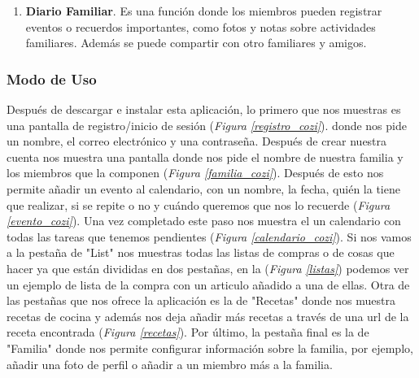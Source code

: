 \begin{enumerate}
    \begin{enumerate}
        \item Organizador de Menús. Facilita organizar las comidas con antelación y evita el estrés diario de decidir qué cocinar. 
        \item Recetas Integradas. Puedes guardar y organizar recetas directamente en la aplicación y con solo un clic. 
        \item Sincronización con el calendario. Los menús planificados pueden sincronizarse con el calendario para que toda la familia lo vea. 
    \end{enumerate}
    \item \textbf{Diario Familiar}. Es una función donde los miembros pueden registrar eventos o recuerdos importantes, como fotos y notas sobre actividades familiares. 
    Además se puede compartir con otro familiares y amigos.
\end{enumerate}

\subsubsection{Modo de Uso}
\label{subsec:uso_cozi}
Después de descargar e instalar esta aplicación, lo primero que nos muestras es una pantalla de registro/inicio de sesión (\textit{Figura \ref{registro_cozi}}).
donde nos pide un nombre, el correo electrónico y una contraseña. Después de crear nuestra cuenta nos muestra una pantalla donde nos pide 
el nombre de nuestra familia y los miembros que la componen (\textit{Figura \ref{familia_cozi}}). Después de esto nos permite añadir un evento al calendario, con
un nombre, la fecha, quién la tiene que realizar, si se repite o no y cuándo queremos que nos lo recuerde (\textit{Figura \ref{evento_cozi}}). Una vez completado este 
paso nos muestra el un calendario con todas las tareas que tenemos pendientes (\textit{Figura \ref{calendario_cozi}}). Si nos vamos a la pestaña de "List"
nos muestras todas las listas de compras o de cosas que hacer ya que están divididas en dos pestañas, en la (\textit{Figura \ref{listas}}) podemos ver un ejemplo de lista 
de la compra con un articulo añadido a una de ellas. Otra de las pestañas que nos ofrece la aplicación es la de "Recetas" donde nos muestra recetas de cocina y además nos deja 
añadir más recetas a través de una url de la receta encontrada (\textit{Figura \ref{recetas}}). Por último, la pestaña final es la de "Familia" donde nos permite configurar información sobre la familia, por ejemplo, 
añadir una foto de perfil o añadir a un miembro más a la familia. 

